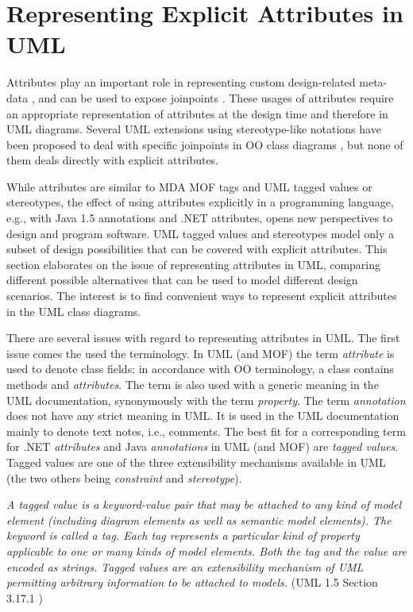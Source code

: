 \section{Representing Explicit Attributes in {UML}}
\label{sec:problem-statement}

Attributes play an important role in representing custom design-related meta-data \cite{design.attrib,aop.attrib.05,www.aop.metadata,java.compost}, and can be used to expose joinpoints \cite{kiczalesetal.97} . These usages of attributes require an appropriate representation of attributes at the design time and therefore in UML  \cite{www.uml} diagrams. Several UML extensions using stereotype-like notations have been proposed to deal with specific joinpoints in OO class diagrams \cite{dong02,berner99,aspectj.uml.05}, but none of them deals directly with explicit attributes.

While attributes are similar to MDA MOF \cite{www.mof} tags and UML \cite{www.uml} tagged values or stereotypes, the effect of using attributes explicitly in a programming language, e.g., with Java 1.5 \cite{www.java.meta} annotations and .NET \cite{netattrib} attributes, opens new perspectives to design and program software. UML tagged values and stereotypes model only a subset of design possibilities that can be covered with explicit attributes. This section elaborates on the issue of representing attributes in UML, comparing different possible alternatives that can be used to model different design scenarios. The interest is to find convenient ways to represent explicit attributes in the UML class diagrams.

There are several issues with regard to representing attributes in UML. The first issue comes the used the terminology. In UML (and MOF) the term \textit{attribute} is used to denote class fields: in accordance with OO terminology, a class contains methods and \textit{attributes}. The term is also used with a generic meaning in the UML documentation, synonymously with the term \textit{property}. The term \textit{annotation} does not have any strict meaning in UML. It is used in the UML documentation mainly to denote text notes, i.e., comments. The best fit for a corresponding term for .NET \textit{attributes} and Java \textit{annotations} in UML (and MOF) are \textit{tagged values}. Tagged values are one of the three extensibility mechanisms available in UML (the two others being \textit{constraint} and \textit{stereotype}).

\begin{dinglist}{43}
\item \textit{A tagged value is a keyword-value pair that may be attached to
any kind of model element (including diagram elements as well as semantic
model elements). The keyword is called a tag. Each tag represents a particular
kind of property applicable to one or many kinds of model elements. Both the
tag and the value are encoded as strings. Tagged values are an extensibility
mechanism of UML permitting arbitrary information to be attached to models.}
(UML 1.5 Section 3.17.1 \cite{www.uml})
\end{dinglist}


